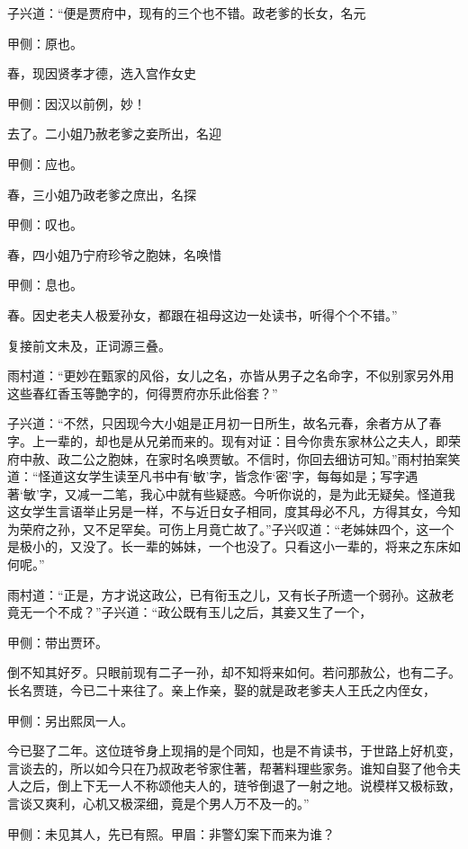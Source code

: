 \begin{parag}
    子兴道：“便是贾府中，现有的三个也不错。政老爹的长女，名元\begin{note}甲侧：原也。\end{note}春，现因贤孝才德，选入宫作女史\begin{note}甲侧：因汉以前例，妙！\end{note}去了。二小姐乃赦老爹之妾所出，名迎\begin{note}甲侧：应也。\end{note}春，三小姐乃政老爹之庶出，名探\begin{note}甲侧：叹也。\end{note}春，四小姐乃宁府珍爷之胞妹，名唤惜\begin{note}甲侧：息也。\end{note}春。因史老夫人极爱孙女，都跟在祖母这边一处读书，听得个个不错。”\begin{note}复接前文未及，正词源三叠。\end{note}雨村道：“更妙在甄家的风俗，女儿之名，亦皆从男子之名命字，不似别家另外用这些春红香玉等艶字的，何得贾府亦乐此俗套？”
\end{parag}


\begin{parag}
    子兴道：“不然，只因现今大小姐是正月初一日所生，故名元春，余者方从了春字。上一辈的，却也是从兄弟而来的。现有对证：目今你贵东家林公之夫人，即荣府中赦、政二公之胞妹，在家时名唤贾敏。不信时，你回去细访可知。”雨村拍案笑道：“怪道这女学生读至凡书中有‘敏’字，皆念作‘密’字，每每如是；写字遇著‘敏’字，又减一二笔，我心中就有些疑惑。今听你说的，是为此无疑矣。怪道我这女学生言语举止另是一样，不与近日女子相同，度其母必不凡，方得其女，今知为荣府之孙，又不足罕矣。可伤上月竟亡故了。”子兴叹道：“老姊妹四个，这一个是极小的，又没了。长一辈的姊妹，一个也没了。只看这小一辈的，将来之东床如何呢。”
\end{parag}


\begin{parag}
    雨村道：“正是，方才说这政公，已有衔玉之儿，又有长子所遗一个弱孙。这赦老竟无一个不成？”子兴道：“政公既有玉儿之后，其妾又生了一个，\begin{note}甲侧：带出贾环。\end{note}倒不知其好歹。只眼前现有二子一孙，却不知将来如何。若问那赦公，也有二子。长名贾琏，今已二十来往了。亲上作亲，娶的就是政老爹夫人王氏之内侄女，\begin{note}甲侧：另出熙凤一人。\end{note}今已娶了二年。这位琏爷身上现捐的是个同知，也是不肯读书，于世路上好机变，言谈去的，所以如今只在乃叔政老爷家住著，帮著料理些家务。谁知自娶了他令夫人之后，倒上下无一人不称颂他夫人的，琏爷倒退了一射之地。说模样又极标致，言谈又爽利，心机又极深细，竟是个男人万不及一的。”\begin{note}甲侧：未见其人，先已有照。甲眉：非警幻案下而来为谁？\end{note}
\end{parag}


